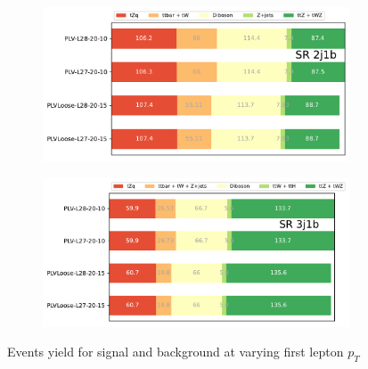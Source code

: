 \begin{figure}[h!] 
  \begin{subfigure}[b]{0.49\linewidth}
    \centering
    \includegraphics[width=\linewidth]{ubonn-thesis/Chapters/Chapters_05/Figure/Cuts Optimization/SR2j1b_PLVLoose_27.pdf} 
  \end{subfigure} 
  \hfill
  \begin{subfigure}[b]{0.49\linewidth}
    \centering
    \includegraphics[width=\linewidth]{ubonn-thesis/Chapters/Chapters_05/Figure/Cuts Optimization/SR3j1b_PLVLoose_27.pdf} 
  \end{subfigure} 
  \caption{Events yield for signal and background at varying first lepton $p_{T}$ }
  \end{figure}
